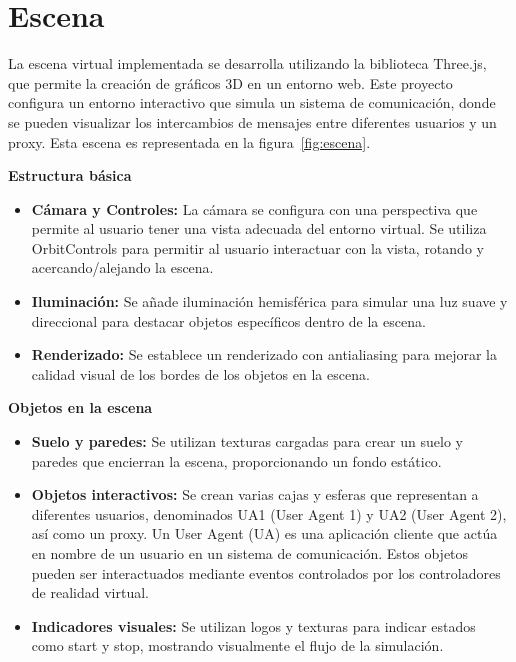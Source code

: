 \documentclass[a4paper, 12pt]{book}
\begin{document}
\section{Escena} 
\label{sec:escena}

La escena virtual implementada se desarrolla utilizando la biblioteca Three.js, 
que permite la creación de gráficos 3D en un entorno web. Este proyecto configura un entorno interactivo 
que simula un sistema de comunicación, donde se pueden visualizar los intercambios de mensajes entre diferentes usuarios y un proxy.
Esta escena es representada en la figura~\ref{fig:escena}.

\bigskip

\textbf{Estructura básica}

\begin{itemize}
  \item \textbf{Cámara y Controles:} La cámara se configura con una perspectiva que permite al usuario tener una vista adecuada del entorno virtual. 
  Se utiliza OrbitControls para permitir al usuario interactuar con la vista, rotando y acercando/alejando la escena.
  
  \item \textbf{Iluminación:} Se añade iluminación hemisférica para simular una luz suave y direccional 
  para destacar objetos específicos dentro de la escena.

  \item \textbf{Renderizado:} Se establece un renderizado con antialiasing para mejorar la calidad visual de los bordes de los objetos en la escena.
  
\end{itemize}

\textbf{Objetos en la escena}

\begin{itemize}
  \item \textbf{Suelo y paredes:} Se utilizan texturas cargadas para crear un suelo y paredes que encierran la escena, proporcionando un fondo estático.

  \item \textbf{Objetos interactivos:} Se crean varias cajas y esferas que representan a diferentes usuarios, denominados UA1 (User Agent 1) y UA2 (User Agent 2), 
  así como un proxy. Un User Agent (UA) es una aplicación cliente que actúa en nombre de un usuario en un sistema de comunicación. Estos objetos pueden ser interactuados 
  mediante eventos controlados por los controladores de realidad virtual.

  \item \textbf{Indicadores visuales:} Se utilizan logos y texturas para indicar estados como start y stop, mostrando visualmente el flujo de la simulación.
  
\end{itemize}
\end{document}
